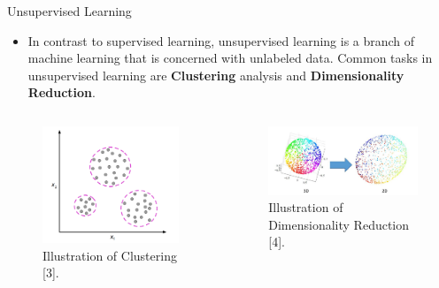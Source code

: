 \documentclass[compress,oilve]{beamer}
\begin{document}
\begin{frame}{Unsupervised Learning}
\begin{itemize}
\item In contrast to supervised learning, unsupervised learning is a branch of machine learning that is concerned with unlabeled data. Common tasks in unsupervised learning are \textbf{Clustering} analysis and \textbf{Dimensionality Reduction}.
\end{itemize}
\begin{columns}
\begin{column}{0.4\textwidth}
\begin{figure}
 \centering
 \includegraphics[scale=0.25]{14}  
 \caption{Illustration of Clustering [3].}
\end{figure}
\end{column}
\begin{column}{0.6\textwidth}
\begin{figure}
 \centering
 \includegraphics[scale=0.25]{16}  
 \caption{Illustration of Dimensionality Reduction [4].}
\end{figure}
\end{column}
\end{columns}
\end{frame}
\end{document}
